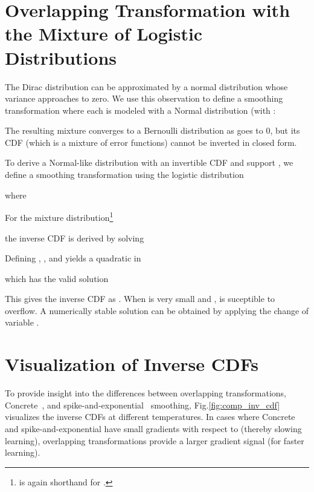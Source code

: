 \documentclass{article}
\begin{document}
\section{Overlapping Transformation with the Mixture of Logistic Distributions} \label{app:otherOverlap}

The Dirac  distribution can be approximated by a normal distribution whose variance approaches to zero. We 
use this observation to define a smoothing transformation where each  is modeled with a Normal distribution 
(with :

The resulting mixture  converges to a Bernoulli distribution as  goes to 0, but 
its CDF (which is a mixture of error functions) cannot be inverted in closed form.

To derive a Normal-like distribution with an invertible CDF and support , 
we define a smoothing transformation using the logistic distribution

where

For the mixture distribution\footnote{ is again shorthand for .}

the inverse CDF is derived by solving

Defining , , and  yields a quadratic in 

which has the valid solution

This gives the inverse CDF as . When  is very small and , 
 is suceptible to overflow. A numerically stable solution can be obtained by applying the change of variable .

\section{Visualization of Inverse CDFs} \label{app:invCDFViz}
\begin{figure*}
  \centering
    \caption{Visualization of inverse CDF as a function of  at  for different smoothing transformations with
    three different temperatures () and inverse temperatures (). We have selected temperature values that are often 
    used in practice.
    }
     \label{fig:comp_inv_cdf}
\end{figure*}
To provide insight into the differences between overlapping transformations, Concrete~\cite{maddison2016concrete, jang2016categorical}, and 
spike-and-exponential~\cite{rolfe2016discrete} smoothing, Fig.\ref{fig:comp_inv_cdf} visualizes the inverse CDFs at different temperatures. 
In cases where Concrete and spike-and-exponential have small gradients with respect to  (thereby slowing learning), overlapping transformations 
provide a larger gradient signal (for faster learning).
\end{document}
